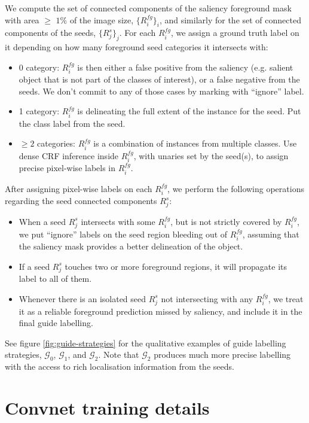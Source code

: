 \documentclass[british,10pt,twocolumn,letterpaper]{article}
\begin{document}
We compute the set of connected components of the saliency foreground
mask with area $\geq$ $1\%$ of the image size, $\{R_{i}^{fg}\}_{i}$,
and similarly for the set of connected components of the seeds, $\{R_{j}^{s}\}_{j}$.
For each $R_{i}^{fg}$, we assign a ground truth label on it depending
on how many foreground seed categories it intersects with:
\begin{itemize}
\item 0 category: $R_{i}^{fg}$ is then either a false positive from the
saliency (e.g. salient object that is not part of the classes of interest),
or a false negative from the seeds. We don't commit to any of those
cases by marking with ``ignore'' label.
\item 1 category: $R_{i}^{fg}$ is delineating the full extent of the instance
for the seed. Put the class label from the seed.
\item $\geq2$ categories: $R_{i}^{fg}$ is a combination of instances from
multiple classes. Use dense CRF inference inside $R_{i}^{fg}$, with
unaries set by the seed(s), to assign precise pixel-wise labels in
$R_{i}^{fg}$.
\end{itemize}
After assigning pixel-wise labels on each $R_{i}^{fg}$, we perform
the following operations regarding the seed connected components $R_{j}^{s}$:
\begin{itemize}
\item When a seed $R_{j}^{s}$ intersects with some $R_{i}^{fg}$, but is
not strictly covered by $R_{i}^{fg}$, we put ``ignore'' labels
on the seed region bleeding out of $R_{i}^{fg}$, assuming that the
saliency mask provides a better delineation of the object.
\item If a seed $R_{j}^{s}$ touches two or more foreground regions, it
will propagate its label to all of them.
\item Whenever there is an isolated seed $R_{j}^{s}$ not intersecting with
any $R_{i}^{fg}$, we treat it as a reliable foreground prediction
missed by saliency, and include it in the final guide labelling. 
\end{itemize}

See figure \ref{fig:guide-strategies} for the qualitative examples
of guide labelling strategies, $\mathcal{G}_{0}$, $\mathcal{G}_{1}$,
and $\mathcal{G}_{2}$. Note that $\mathcal{G}_{2}$ produces much
more precise labelling with the access to rich localisation information
from the seeds. 

\section{\label{sec:supp-convnet-training}Convnet training details}
\end{document}
